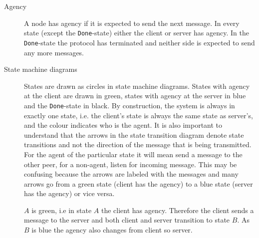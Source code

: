 \documentclass{report}
\newcommand{\state}[1]{\texttt{#1}}
\newcommand{\Done}{\state{Done}}
\theoremstyle{definition}{
  \newtheorem{lemma}{Lemma}[section] %
  \newtheorem{definition}[lemma]{Definition}
}
\theoremstyle{theorem}{
  \newtheorem{invariant}[lemma]{Invariant}
  \newtheorem{proofobligation}[lemma]{Proof Obligation}
}
\numberwithin{equation}{lemma}
\begin{document}
\begin{description}
\item[Agency]
  A node has agency if it is expected to send the next message.
  In every state (except the \Done-state) either the client or server has agency.
  In the \Done-state the protocol has terminated and neither side is expected to send any more
  messages.

\item [State machine diagrams]
      States are drawn as circles in state machine diagrams.
      States with agency at the client are drawn in green, states with agency at the server in blue and
      the \Done-state in black.
      By construction, the system is always in exactly one state,
      i.e. the client's state is always the same state as server's,
      and the colour indicates who is the agent.
      It is also important to understand that the arrows in the state transition diagram denote
      state transitions and not the direction of the message that is being transmitted.
      For the agent of the particular state it will mean send a message to the
      other peer, for a non-agent, listen for incoming message.
      This may be confusing because the arrows are labeled with the messages and
      many arrows go from a green state (client has the agency) to a blue
      state (server has the agency) or vice versa.



      $A$ is green, i.e in state $A$ the client has agency.
      Therefore the client sends a message to the server and
      both client and server transition to state $B$.
      As $B$ is blue the agency also changes from client so server.



\end{description}
\end{document}
